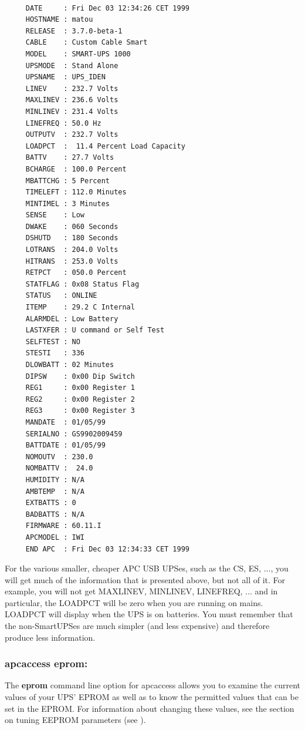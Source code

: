 {{{{\footnotesize
\begin{verbatim}
     
     DATE     : Fri Dec 03 12:34:26 CET 1999
     HOSTNAME : matou
     RELEASE  : 3.7.0-beta-1
     CABLE    : Custom Cable Smart
     MODEL    : SMART-UPS 1000
     UPSMODE  : Stand Alone
     UPSNAME  : UPS_IDEN
     LINEV    : 232.7 Volts
     MAXLINEV : 236.6 Volts
     MINLINEV : 231.4 Volts
     LINEFREQ : 50.0 Hz
     OUTPUTV  : 232.7 Volts
     LOADPCT  :  11.4 Percent Load Capacity
     BATTV    : 27.7 Volts
     BCHARGE  : 100.0 Percent
     MBATTCHG : 5 Percent
     TIMELEFT : 112.0 Minutes
     MINTIMEL : 3 Minutes
     SENSE    : Low
     DWAKE    : 060 Seconds
     DSHUTD   : 180 Seconds
     LOTRANS  : 204.0 Volts
     HITRANS  : 253.0 Volts
     RETPCT   : 050.0 Percent
     STATFLAG : 0x08 Status Flag
     STATUS   : ONLINE
     ITEMP    : 29.2 C Internal
     ALARMDEL : Low Battery
     LASTXFER : U command or Self Test
     SELFTEST : NO
     STESTI   : 336
     DLOWBATT : 02 Minutes
     DIPSW    : 0x00 Dip Switch
     REG1     : 0x00 Register 1
     REG2     : 0x00 Register 2
     REG3     : 0x00 Register 3
     MANDATE  : 01/05/99
     SERIALNO : GS9902009459
     BATTDATE : 01/05/99
     NOMOUTV  : 230.0
     NOMBATTV :  24.0
     HUMIDITY : N/A
     AMBTEMP  : N/A
     EXTBATTS : 0
     BADBATTS : N/A
     FIRMWARE : 60.11.I
     APCMODEL : IWI
     END APC  : Fri Dec 03 12:34:33 CET 1999
\end{verbatim}
\normalsize

For the various smaller, cheaper APC USB UPSes, such as the CS, ES, ..., you
will get much of the information that is presented above, but not all of it.
For example, you will not get MAXLINEV, MINLINEV, LINEFREQ, ... and in
particular, the LOADPCT will be zero when you are running on mains. LOADPCT
will display when the UPS is on batteries.  You must remember that the
non-SmartUPSes are much simpler (and less expensive) and therefore produce
less information. 

\label{apcaccess-eprom}

\subsubsection*{apcaccess eprom:}

\label{index-apcaccess-eeprom-114}
\label{index-eeprom_002c-apcaccess-115}
The {\bf eprom} command line option for apcaccess allows you to examine the
current values of your UPS' EPROM as well as to know the permitted values that
can be set in the EPROM. For information about changing these values, see the
section on tuning EEPROM parameters (see 
).  

}}}}
